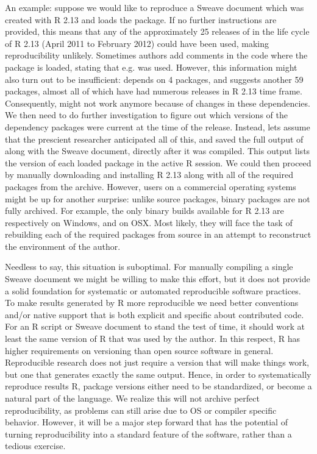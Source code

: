 An example: suppose we would like to reproduce a Sweave document which was
created with R 2.13 and loads the  package. If no further
instructions are provided, this means that any of the approximately 25 releases
of  in the life cycle of R 2.13 (April 2011 to February 2012) could
have been used, making reproducibility unlikely. Sometimes authors add comments
in the code where the package is loaded, stating that e.g.  was
used. However, this information might also turn out to be insufficient:
 depends on 4 packages, and suggests another 59 packages, almost all of which
have had numerous releases in R 2.13 time frame.
Consequently,  might not work anymore because of changes in
these dependencies. We then need to do further investigation to figure out
which versions of the dependency packages were current at the time of the
 release. Instead, lets assume that the prescient researcher
anticipated all of this, and saved the full output of 
along with the Sweave document, directly after it was compiled. This output
lists the version of each loaded package in the active R session.
We could then proceed by manually downloading and installing R 2.13 along with
all of the required packages from the archive. However, users on a commercial
operating systems might be up for another surprise: unlike source packages,
binary packages are not fully archived. For example, the only binary builds
available for R 2.13 are respectively  on Windows, and
 on OSX. Most likely, they will face the task of rebuilding
each of the required packages from source in an attempt to reconstruct the
environment of the author.

Needless to say, this situation is suboptimal. For manually compiling a single
Sweave document we might be willing to make this effort, but it does not
provide a solid foundation for systematic or automated reproducible software
practices. To make results generated by R more reproducible we need better
conventions and/or native support that is both explicit and specific about
contributed code. For an R script or Sweave document to stand the test of time,
it should work at least the same version of R that was used by the author. In
this respect, R has higher requirements on versioning than open source software
in general. Reproducible research does not just require a version that will
make things work, but one that generates exactly the same output. Hence, in
order to systematically reproduce results R, package versions either need to be
standardized, or become a natural part of the language. We realize this will
not archive perfect reproducibility, as problems can still arise due to OS or
compiler specific behavior. However, it will be a major step forward that has
the potential of turning reproducibility into a standard feature of the
software, rather than a tedious exercise.
 
